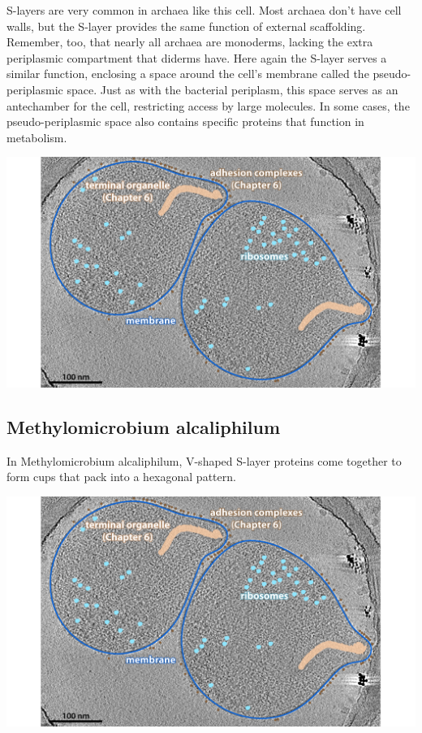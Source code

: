 \documentclass[]{tufte-book}
\begin{document}
S-layers are very common in archaea like this cell. Most archaea don't
have cell walls, but the S-layer provides the same function of external
scaffolding. Remember, too, that nearly all archaea are monoderms,
lacking the extra periplasmic compartment that diderms have. Here again
the S-layer serves a similar function, enclosing a space around the
cell's membrane called the pseudo-periplasmic space. Just as with the
bacterial periplasm, this space serves as an antechamber for the cell,
restricting access by large molecules. In some cases, the
pseudo-periplasmic space also contains specific proteins that function
in metabolism.

\includegraphics{img/02_static/2_1_Mgenitalium}

\hypertarget{M._alcaliphilum}{\subsection{Methylomicrobium
alcaliphilum}\label{M._alcaliphilum}}

In Methylomicrobium alcaliphilum, V-shaped S-layer proteins come
together to form cups that pack into a hexagonal pattern.

\includegraphics{img/02_static/2_1_Mgenitalium}
\end{document}
